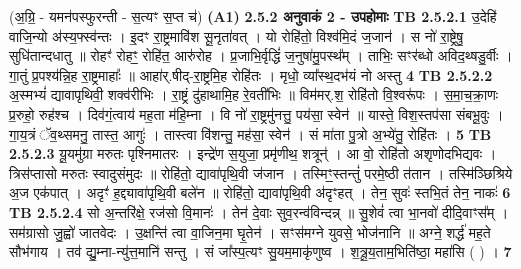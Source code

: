 \documentclass[17pt]{extarticle}
\begin{document}
                                    (अ॒ग्रि॒ - यमन॑पस्फुरन्ती - स॒त्यꣳ स॒प्त च॑) \textbf{(A1)} \newline \newline
                \textbf{ 2.5.2     अनुवाकं   2 -  उपहोमाः} \newline
                                \textbf{ TB 2.5.2.1} \newline
                  उ॒देहि॑ वाजि॒न्यो अ॑स्य॒फ्स्व॑न्तः । इ॒दꣳ रा॒ष्ट्रमावि॑श सू॒नृता॑वत् । यो रोहि॑तो॒ विश्व॑मि॒दं ज॒जान॑ । स नो॑ रा॒ष्ट्रेषु॒ सुधि॑तान्दधातु ॥ रोहꣳ॑ रोहꣳ॒॒ रोहि॑त॒ आरु॑रोह । प्र॒जाभि॒र्वृद्धिं॑ ज॒नुषा॑मु॒पस्थ᳚म् । ताभिः॒ सꣳर॑ब्धो अविद॒थ्षडु॒र्वीः । गा॒तुं प्र॒पश्य॑न्नि॒ह रा॒ष्ट्रमाहाः᳚ ॥ आहा॑र्.षीद्-रा॒ष्ट्रमि॒ह रोहि॑तः । मृधो॒ व्या᳚स्थ॒दभ॑यं नो अस्तु \textbf{ 4} \newline
                  \newline
                                \textbf{ TB 2.5.2.2} \newline
                  अ॒स्मभ्यं॑ द्यावापृथिवी॒ शक्व॑रीभिः । रा॒ष्ट्रं दु॑हाथामि॒ह रे॒वती॑भिः ॥ विम॑मर्.श॒ रोहि॑तो वि॒श्वरू॑पः । स॒मा॒च॒क्रा॒णः प्र॒रुहो॒ रुह॑श्च । दिव॑गं॒त्वाय॑ मह॒ता म॑हि॒म्ना । वि नो॑ रा॒ष्ट्रमु॑नत्तु॒ पय॑सा॒ स्वेन॑ ॥ यास्ते॒ विश॒स्तप॑सा संबभू॒वुः । गा॒य॒त्रं ॅव॒थ्समनु॒ तास्त॒ आगुः॑ । तास्त्वा वि॑शन्तु॒ मह॑सा॒ स्वेन॑ । सं मा॑ता पु॒त्रो अ॒भ्ये॑तु॒ रोहि॑तः । \textbf{ 5} \newline
                  \newline
                                \textbf{ TB 2.5.2.3} \newline
                  यू॒यमु॑ग्रा मरुतः पृश्निमातरः । इन्द्रे॑ण स॒युजा॒ प्रमृ॑णीथ॒ शत्रून्॑ । आ वो॒ रोहि॑तो अशृणोदभिद्यवः । त्रिस॑प्तासो मरुतः स्वादुसंमुदः ॥ रोहि॑तो॒ द्यावा॑पृथि॒वी ज॑जान । तस्मिꣳ॒॒स्तन्तुं॑ परमे॒ष्ठी त॑तान । तस्मि॑ञ्छिश्रिये अ॒ज एक॑पात् । अदृꣳ॑ ह॒द्द्यावा॑पृथि॒वी बले॑न ॥ रोहि॑तो॒ द्यावा॑पृथि॒वी अ॑दृꣳहत् । तेन॒ सुवः॑ स्तभि॒तं तेन॒ नाकः॑ \textbf{ 6} \newline
                  \newline
                                \textbf{ TB 2.5.2.4} \newline
                  सो अ॒न्तरि॑क्षे॒ रज॑सो वि॒मानः॑ । तेन॑ दे॒वाः सुव॒रन्व॑विन्दन्न् ॥ सु॒शेवं॑ त्वा भा॒नवो॑ दीदि॒वाꣳस᳚म् । सम॑ग्रासो जु॒ह्वो॑ जातवेदः । उ॒क्षन्ति॑ त्वा वा॒जिन॒मा घृ॒तेन॑ । सꣳस॑मग्ने युवसे॒ भोज॑नानि ॥ अग्ने॒ शर्द्ध॑ मह॒ते सौभ॑गाय । तव॑ द्यु॒म्ना-न्यु॑त्त॒मानि॑ सन्तु । सं जा᳚स्प॒त्यꣳ सु॒यम॒माकृ॑णुष्व । श॒त्रू॒य॒ताम॒भिति॑ष्ठा॒ महा॑सि ( ) । \textbf{ 7} \newline
\end{document}
